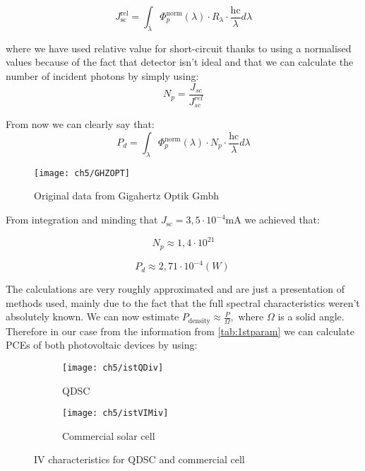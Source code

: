\begin{equation}
J_{\text{sc}}^{\text{rel}} = \int_{\lambda}^{}{\Phi_{p}^{\text{norm}}\left( \lambda \right) \cdot R_{\lambda} \cdot \frac{\text{hc}}{\lambda}d\lambda }
\end{equation}


\noindent where we have used relative value for short-circuit thanks to using a
normalised values because of the fact that detector isn't ideal and that
we can calculate the number of incident photons by simply using:
\begin{equation}
N_{p} = \frac{J_{sc}}{J_{sc}^{rel}}
\end{equation}

\noindent From now we can clearly say that:
\begin{equation}
P_{d} = \int_{\lambda}^{}{\Phi_{p}^{\text{norm}}\left( \lambda \right) \cdot N_{p} \cdot \frac{\text{hc}}{\lambda}d \lambda }
\end{equation}

\begin{figure}[H]
\center
\texttt{[image: ch5/GHZOPT]}
\caption{Original data from Gigahertz Optik Gmbh}
\end{figure}

\noindent From integration and minding that
\(J_{\text{sc}} = 3,5 \cdot 10^{- 4}\text{mA\ }\)we achieved that:

\[N_{p} \approx 1,4 \cdot 10^{21}\]

\[P_{d} \approx 2,71 \cdot 10^{-4} \left( W \right)\ \]

\noindent The calculations are very roughly approximated and are just a
presentation of methods used, mainly due to the fact that the full
spectral characteristics weren't absolutely known. We can now estimate
\(P_{\text{density}} \approx \frac{P}{\Omega},\) where \(\Omega\) is a
solid angle. Therefore in our case from the information from \ref{tab:1stparam} we can calculate PCEs of both
photovoltaic devices by using:
\begin{figure}[b]
	\centering
	\begin{subfigure}[b]{0.49\textwidth}
	\centering
	\texttt{[image: ch5/istQDiv]}
	\caption{QDSC}
	\end{subfigure}
	\hfill
	\begin{subfigure}[b]{0.49\textwidth}
	\centering
	\texttt{[image: ch5/istVIMiv]}
	\caption{Commercial solar cell}{}
	\end{subfigure}
	\caption{IV characteristics for QDSC and commercial cell }
\end{figure}

